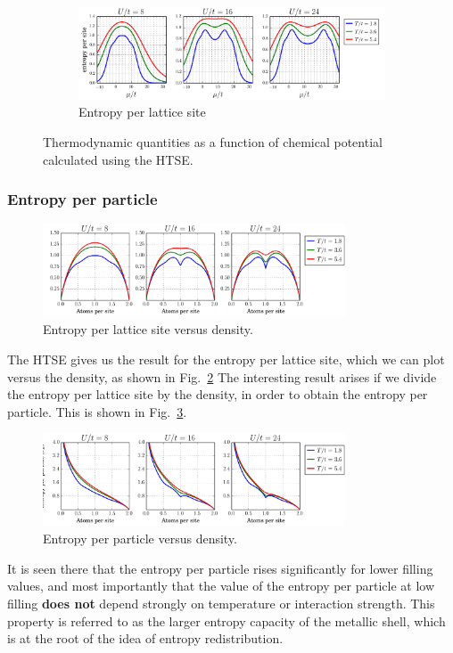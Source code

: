 \documentclass[11pt,letter]{article}
\begin{document}
\begin{figure}
        \begin{subfigure}[b]{0.75\textwidth}
                \includegraphics[width=\textwidth]{figures/HTSE_entropy_U.png}
                \caption{Entropy per lattice site}
        \end{subfigure}
        \caption{Thermodynamic quantities as a function of chemical potential calculated using the HTSE.}\label{fig:HTSEhomogeneous}
\end{figure}

\subsubsection{Entropy per particle}  

\begin{figure}
    \centering
    \includegraphics[width=0.8\textwidth]{figures/HTSE_EntropyPerSite_U.png}
    \caption{Entropy per lattice site versus density.}\label{fig:HTSE_spersite}
\end{figure}
The HTSE gives us the result for the entropy per lattice site, which we can
plot versus the density, as shown in Fig.~\ref{fig:HTSE_spersite}  The
interesting result arises if we divide the entropy per lattice site by the
density, in order to obtain the entropy per particle.  This is shown in
Fig.~\ref{fig:HTSE_sperparticle}. 
\begin{figure}
    \centering
    \includegraphics[width=0.8\textwidth]{figures/HTSE_EntropyPerParticle_U.png}
    \caption{Entropy per particle versus density.}\label{fig:HTSE_sperparticle}
\end{figure}
It is seen there that the entropy per particle rises significantly for lower
filling values, and most importantly that the value of the entropy per particle
at low filling \textbf{does not} depend strongly on temperature or interaction
strength.   This property is referred to as the larger entropy capacity of the
metallic shell,  which is at the root of the idea of entropy redistribution. 
\end{document}
